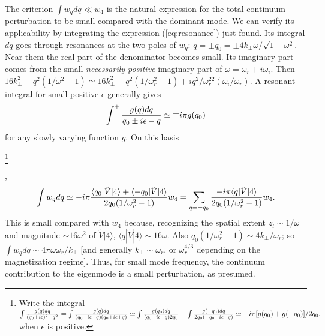 \documentclass[12pt]{article}
\def\ket#1{|#1\rangle}
\def\bra#1{\langle#1}
\begin{document}
The criterion $\int w_q dq\ll w_4$ is the natural expression for the
total continuum perturbation to be small compared with the dominant
mode. We can verify its applicability by integrating the expression
(\ref{eq:resonance}) just found. Its integral $dq$ goes through
resonances at the two poles of $w_q$:
$q=\pm q_0=\pm4k_\perp\omega/\sqrt{1-\omega^2}$. Near them the real
part of the denominator becomes small. Its imaginary part comes from
the small \emph{necessarily positive} imaginary part of
$\omega=\omega_r+i\omega_i$. Then
$16k_\perp^2-q^2(1/\omega^2-1)\simeq 16k_\perp^2-q^2(1/\omega_r^2-1)
+iq^2/\omega_r^22(\omega_i/\omega_r)$.
A resonant integral for small
positive $\epsilon$ generally gives
\begin{equation}
  \label{resint}
  \int_{-}^{+} {g(q) dq\over q_0\pm i\epsilon-q}\simeq \mp i\pi g(q_0)
\end{equation}
for any slowly varying function $g$. On this basis
\iftrue
\footnote{Write the integral $\int{g(q)dq\over
  (q_0+i\epsilon)^2-q^2}=\int{g(q)dq\over 
(q_0+i\epsilon-q)(q_0+i\epsilon+q)}\simeq \int{g(q_0)dq\over
  (q_0+i\epsilon-q)2q_0}-\int{g(-q_0)dq\over
  2q_0(-q_0-i\epsilon-q) }\simeq -i\pi [g(q_0)+g(-q_0)]/2q_0. $ when
 $\epsilon$ is
positive.}
\fi
,
\begin{equation}
  \label{poles}
  \int w_q dq \simeq -i\pi {\bra{q_0}|\tilde{V}\ket{4}
    +\bra{-q_0}|\tilde{V}\ket{4}
    \over
    2q_0(1/\omega_r^2-1)
  }w_4
  =\sum_{q=\pm q_0}{-i\pi\bra{q}|\tilde{V}\ket{4}
    \over
    2q_0(1/\omega_r^2-1)}w_4.
\end{equation}
This is small compared with $w_4$ because, recognizing the spatial
extent $z_l\sim 1/\omega$ and magnitude $\sim 16\omega^2$ of
$\tilde V\ket{4}$, $\bra{q}|\tilde V \ket{4}\sim 16\omega$. Also
$q_0(1/\omega_r^2-1)\sim 4 k_\perp/\omega_r$; so
$\int w _q dq\sim 4\pi\omega\omega_r/k_\perp$ [and generally
$k_\perp\sim \omega_r$, or $\omega_r^{4/3}$ depending on the
magnetization regime]. Thus, for small mode frequency, the
continuum contribution to the eigenmode is a small perturbation, as
presumed.
\end{document}
